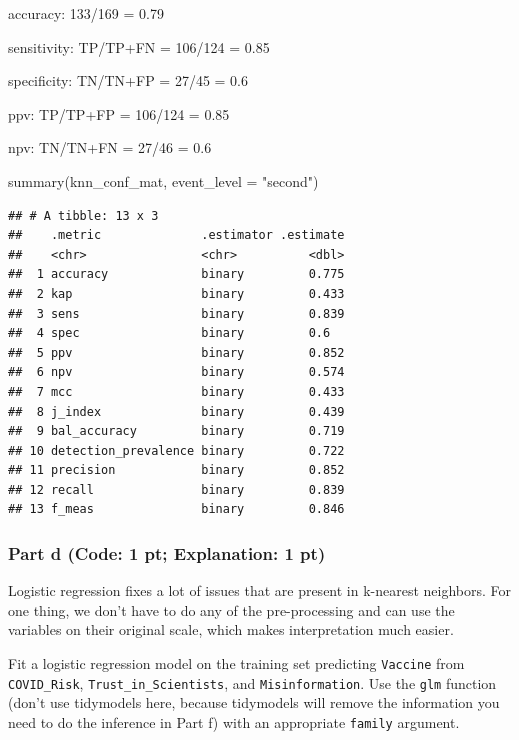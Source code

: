 \documentclass[
]{article}
\newenvironment{Shaded}{\begin{snugshade}}{\end{snugshade}}
\newcommand{\AttributeTok}[1]{\textcolor[rgb]{0.77,0.63,0.00}{#1}}
\newcommand{\FunctionTok}[1]{\textcolor[rgb]{0.00,0.00,0.00}{#1}}
\newcommand{\NormalTok}[1]{#1}
\newcommand{\StringTok}[1]{\textcolor[rgb]{0.31,0.60,0.02}{#1}}
\begin{document}
accuracy: 133/169 = 0.79

sensitivity: TP/TP+FN = 106/124 = 0.85

specificity: TN/TN+FP = 27/45 = 0.6

ppv: TP/TP+FP = 106/124 = 0.85

npv: TN/TN+FN = 27/46 = 0.6

\begin{Shaded}
\begin{Highlighting}[]
\FunctionTok{summary}\NormalTok{(knn\_conf\_mat, }\AttributeTok{event\_level =} \StringTok{"second"}\NormalTok{)}
\end{Highlighting}
\end{Shaded}

\begin{verbatim}
## # A tibble: 13 x 3
##    .metric              .estimator .estimate
##    <chr>                <chr>          <dbl>
##  1 accuracy             binary         0.775
##  2 kap                  binary         0.433
##  3 sens                 binary         0.839
##  4 spec                 binary         0.6  
##  5 ppv                  binary         0.852
##  6 npv                  binary         0.574
##  7 mcc                  binary         0.433
##  8 j_index              binary         0.439
##  9 bal_accuracy         binary         0.719
## 10 detection_prevalence binary         0.722
## 11 precision            binary         0.852
## 12 recall               binary         0.839
## 13 f_meas               binary         0.846
\end{verbatim}

\hypertarget{part-d-code-1-pt-explanation-1-pt}{%
\subsubsection{Part d (Code: 1 pt; Explanation: 1
pt)}\label{part-d-code-1-pt-explanation-1-pt}}

Logistic regression fixes a lot of issues that are present in k-nearest
neighbors. For one thing, we don't have to do any of the pre-processing
and can use the variables on their original scale, which makes
interpretation much easier.

Fit a logistic regression model on the training set predicting
\texttt{Vaccine} from \texttt{COVID\_Risk},
\texttt{Trust\_in\_Scientists}, and \texttt{Misinformation}. Use the
\texttt{glm} function (don't use tidymodels here, because tidymodels
will remove the information you need to do the inference in Part f) with
an appropriate \texttt{family} argument.
\end{document}
